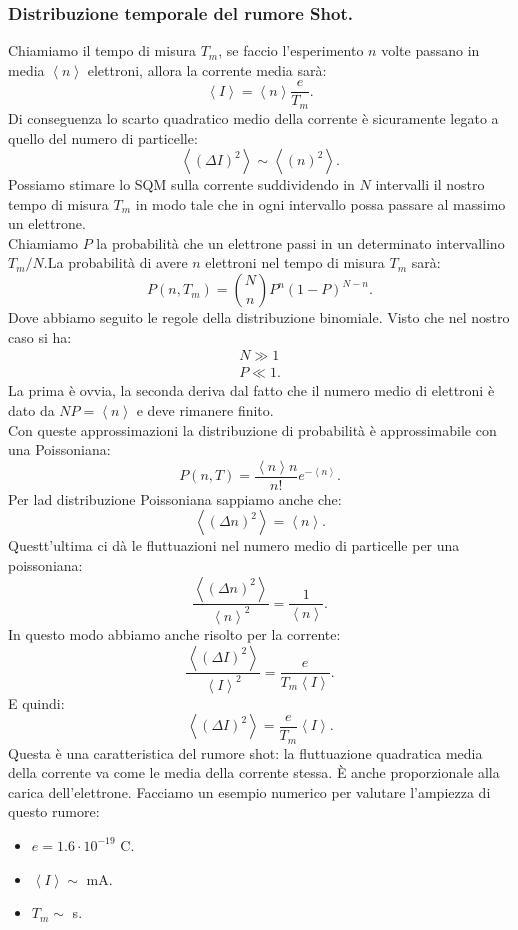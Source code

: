 \subsubsection{Distribuzione temporale del rumore Shot.}
\label{subsubsec:Distribuzione temporale del rumore Shot.}
Chiamiamo il tempo di misura $T_m$, se faccio l'esperimento $n$ volte passano in media $\left<n \right>$ elettroni, allora la corrente media sarà:
\[
	\left<I\right>
	=
	\left<n\right>\frac{e}{T_m}
.\] 
Di conseguenza lo scarto quadratico medio della corrente è sicuramente legato a quello del numero di particelle:
\[
	\left< \left( \Delta I \right)^2  \right>  \sim \left<\left(n\right)^2\right>
.\] 
Possiamo stimare lo SQM sulla corrente suddividendo in $N$ intervalli il nostro tempo di misura $T_m$ in modo tale che in ogni intervallo possa passare al massimo un elettrone. \\
Chiamiamo $P$ la probabilità che un elettrone passi in un determinato intervallino $T_m/N$.La probabilità di avere $n$ elettroni nel tempo di misura $T_m$ sarà:
\[
	P( n, T_m) = \binom{N}{n} P^n \left( 1- P \right)^{N-n}
.\] 
Dove abbiamo seguito le regole della distribuzione binomiale. Visto che nel nostro caso si ha:
\[\begin{aligned}
	N\gg 1\\
	P\ll 1
.\end{aligned}\]
La prima è ovvia, la seconda deriva dal fatto che il numero medio di elettroni è dato da $NP = \left<n \right>$ e deve rimanere finito. \\
Con queste approssimazioni la distribuzione di probabilità è approssimabile con una Poissoniana:
\[
	P( n,T) 
	=
	\frac{\left<n \right>n}{n!}e^{-\left<n \right>}
.\] 
Per lad distribuzione Poissoniana sappiamo anche che:
\[
	\left<\left( \Delta n\right) ^2 \right> = \left<n \right>
.\] 
Questt'ultima ci dà le fluttuazioni nel numero medio di particelle per una poissoniana:
\[
	\frac{\left<\left( \Delta n \right)^2 \right>}{\left<n \right>^2}
	=
	\frac{1}{\left<n \right>}
.\] 
In questo modo abbiamo anche risolto per la corrente:
\[
	\frac{\left<\left(\Delta I\right)^2\right>}{\left<I\right>^2}
	=
	\frac{e}{T_m \left< I \right>}
.\] 
E quindi:
\[
	\left<\left( \Delta I \right) ^2 \right> 
	= 
	\frac{e}{T_m}\left<I \right>
.\] 
Questa è una caratteristica del rumore shot: la fluttuazione quadratica media della corrente va come le media della corrente stessa. È anche proporzionale alla carica dell'elettrone. Facciamo un esempio numerico per valutare l'ampiezza di questo rumore:
\begin{itemize}
	\item $e=1.6 \cdot 10^{-19}$ C.
	\item $\left<I \right>\sim$ mA.
	\item $T_m\sim$ s.
\end{itemize}
